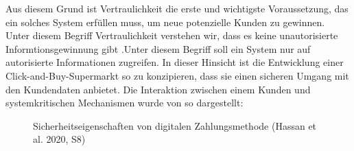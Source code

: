Aus diesem Grund ist Vertraulichkeit die erste und wichtigste Voraussetzung, das ein solches System 
erfüllen muss, um neue potenzielle Kunden zu gewinnen. Unter diesem Begriff Vertraulichkeit verstehen wir, 
dass es keine unautorisierte Informtionsgewinnung gibt \cite{refbook:SWIS} .Unter diesem Begriff soll
ein System nur auf autorisierte Informationen zugreifen. In dieser Hinsicht ist die Entwicklung 
einer Click-and-Buy-Supermarkt so zu konzipieren, dass sie einen sicheren Umgang mit den Kundendaten
anbietet. Die Interaktion zwischen einem Kunden und systemkritischen Mechanismen wurde von
\cite{refart:HARE} so dargestellt:

\vfill
\begin{figure}[htb]
    \caption{Sicherheitseigenschaften von digitalen Zahlungsmethode (Hassan et al. 2020, S8)}
    \label{fig:refark_HARE}
\end{figure}
\vfill


